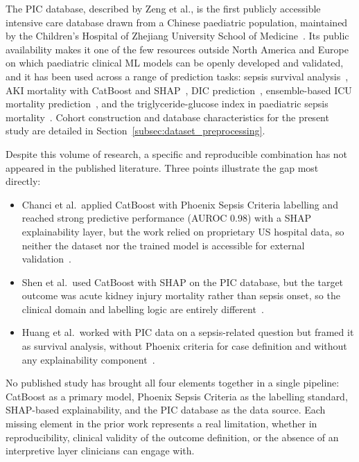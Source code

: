 \documentclass[final,3p,times]{elsarticle}
\begin{document}
The PIC database, described by Zeng et al., is the first publicly
accessible intensive care database drawn from a Chinese paediatric
population, maintained by the Children's Hospital of Zhejiang
University School of Medicine~\cite{zeng2020}. Its public
availability makes it one of the few resources outside North
America and Europe on which paediatric clinical ML models can be
openly developed and validated, and it has been used across a
range of prediction tasks: sepsis survival analysis~\cite{huang2025},
AKI mortality with CatBoost and SHAP~\cite{shen2025}, DIC
prediction~\cite{zhou2025}, ensemble-based ICU mortality
prediction~\cite{hong2021}, and the triglyceride-glucose index in
paediatric sepsis mortality~\cite{ding2026}. Cohort construction
and database characteristics for the present study are detailed in
Section~\ref{subsec:dataset_preprocessing}.

Despite this volume of research, a specific and reproducible
combination has not appeared in the published literature. Three
points illustrate the gap most directly:

\begin{itemize}
    \item Chanci et al.\ applied CatBoost with Phoenix Sepsis
    Criteria labelling and reached strong predictive performance
    (AUROC 0.98) with a SHAP explainability layer, but the work
    relied on proprietary US hospital data, so neither the dataset
    nor the trained model is accessible for external
    validation~\cite{chanci2025}.
    \item Shen et al.\ used CatBoost with SHAP on the PIC database,
    but the target outcome was acute kidney injury mortality rather
    than sepsis onset, so the clinical domain and labelling logic
    are entirely different~\cite{shen2025}.
    \item Huang et al.\ worked with PIC data on a sepsis-related
    question but framed it as survival analysis, without Phoenix
    criteria for case definition and without any explainability
    component~\cite{huang2025}.
\end{itemize}

No published study has brought all four elements together in a
single pipeline: CatBoost as a primary model, Phoenix Sepsis
Criteria as the labelling standard, SHAP-based explainability, and
the PIC database as the data source. Each missing element in the
prior work represents a real limitation, whether in
reproducibility, clinical validity of the outcome definition, or
the absence of an interpretive layer clinicians can engage with.
\end{document}
